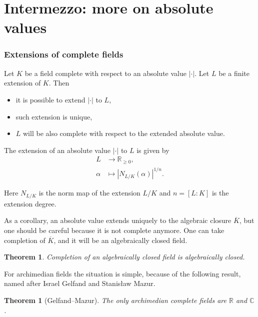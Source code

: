 \documentclass{article}
\theoremstyle{myplain}
\newtheorem{theorem}[proposition]{Theorem}
\theoremstyle{mydefinition}
\begin{document}
\pagebreak

\part{Intermezzo: more on absolute values}

\section{Extensions of complete fields}

Let $K$ be a field complete with respect to an absolute value $|\cdot|$. Let $L$
be a finite extension of $K$. Then

\begin{itemize}
\item it is possible to extend $|\cdot|$ to $L$,

\item such extension is unique,

\item $L$ will be also complete with respect to the extended absolute value.
\end{itemize}

The extension of an absolute value $|\cdot|$ to $L$ is given
by \label{complete-abs-extension}
\begin{align*}
  L & \to \mathbb{R}_{\ge 0},\\
  \alpha & \mapsto |N_{L/K} (\alpha)|^{1/n}.
\end{align*}

Here $N_{L/K}$ is the norm map of the extension $L/K$ and $n = [L : K]$ is the
extension degree.

As a corollary, an absolute value extends uniquely to the algebraic closure
$\overline{K}$, but one should be careful because it is not complete
anymore. One can take completion of $\overline{K}$, and it will be an
algebraically closed field.

\begin{theorem}
  Completion of an algebraically closed field is algebraically closed.
\end{theorem}

\vspace{1em}

For archimedian fields the situation is simple, because of the following result,
named after Israel Gelfand and Stanis\l{}aw Mazur.

\begin{theorem}[Gelfand--Mazur]
  The only archimedian complete fields are $\mathbb{R}$ and $\mathbb{C}$.
\end{theorem}
\end{document}
